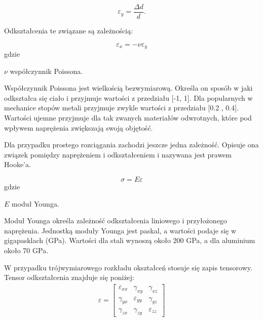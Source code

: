 \begin{equation}
\varepsilon_y=\frac{\Delta d}{d}.
\end{equation}

	Odkształcenia te związane są zależnością:

\begin{equation}
\varepsilon_x=-\nu \varepsilon_y
\end{equation}
gdzie
\begin{eqwhere}[2cm]
        \item[$\nu$] współczynnik Poissona.
\end{eqwhere}

	Współczynnik Poissona jest wielkością bezwymiarową. Określa on sposób w jaki odkształca się ciało i przyjmuje wartości z przedziału [-1, 1]. Dla popularnych w mechanice stopów metali przyjmuje zwykle wartości z przedziału [0.2 , 0.4]. Wartości ujemne przyjmuje dla tak zwanych materiałów odwrotnych, które pod wpływem naprężenia zwiększają swoją objętość.

	Dla przypadku prostego rozciągania zachodzi jeszcze jedna zależność. Opisuje ona związek pomiędzy naprężeniem i odkształceniem i nazywana jest prawem Hooke'a.

\begin{equation}
\sigma=E\varepsilon
\end{equation}
gdzie
\begin{eqwhere}[2cm]
        \item[$E$] moduł Younga.
\end{eqwhere}

	Moduł Younga określa zależność odkształcenia liniowego i przyłożonego naprężenia. Jednostką moduły Younga jest paskal, a wartości podaje się w gigapasklach (GPa). Wartości dla stali wynoszą około 200 GPa, a dla aluminium około 70 GPa.

	W przypadku trójwymiarowego rozkładu okształceń stosuje się zapis tensorowy. Tensor odkształcenia znajduje się poniżej:
\begin{gather}
	\varepsilon=\begin{bmatrix} 
	  \varepsilon_{xx}    & \gamma_{xy} & \gamma_{xz} \\ 
	  \gamma_{yx} & \varepsilon_{yy} & \gamma_{yz} \\
	  \gamma_{zx} & \gamma_{zy} & \varepsilon_{zz} 
	\end{bmatrix}
\end{gather}


